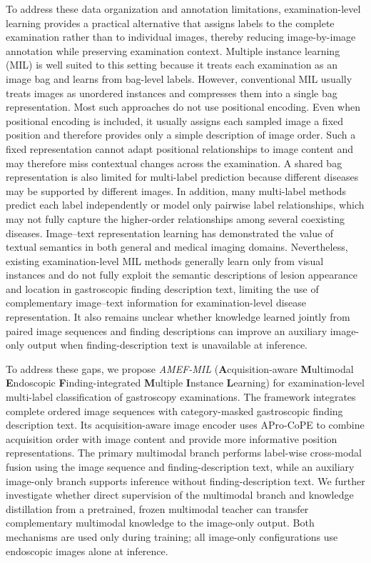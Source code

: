 \documentclass[Afour,sagev,times]{sagej}
\begin{document}
To address these data organization and annotation limitations, examination-level learning provides a practical alternative that assigns labels to the complete examination rather than to individual images, thereby reducing image-by-image annotation while preserving examination context. Multiple instance learning (MIL) is well suited to this setting because it treats each examination as an image bag and learns from bag-level labels. However, conventional MIL usually treats images as unordered instances and compresses them into a single bag representation. Most such approaches do not use positional encoding. Even when positional encoding is included, it usually assigns each sampled image a fixed position and therefore provides only a simple description of image order. Such a fixed representation cannot adapt positional relationships to image content and may therefore miss contextual changes across the examination. A shared bag representation is also limited for multi-label prediction because different diseases may be supported by different images. In addition, many multi-label methods predict each label independently or model only pairwise label relationships, which may not fully capture the higher-order relationships among several coexisting diseases. Image--text representation learning has demonstrated the value of textual semantics in both general and medical imaging domains. Nevertheless, existing examination-level MIL methods generally learn only from visual instances and do not fully exploit the semantic descriptions of lesion appearance and location in gastroscopic finding description text, limiting the use of complementary image--text information for examination-level disease representation. It also remains unclear whether knowledge learned jointly from paired image sequences and finding descriptions can improve an auxiliary image-only output when finding-description text is unavailable at inference.

To address these gaps, we propose \textit{AMEF-MIL} (\textbf{A}cquisition-aware \textbf{M}ultimodal \textbf{E}ndoscopic \textbf{F}inding-integrated \textbf{M}ultiple \textbf{I}nstance \textbf{L}earning) for examination-level multi-label classification of gastroscopy examinations. The framework integrates complete ordered image sequences with category-masked gastroscopic finding description text. Its acquisition-aware image encoder uses APro-CoPE to combine acquisition order with image content and provide more informative position representations. The primary multimodal branch performs label-wise cross-modal fusion using the image sequence and finding-description text, while an auxiliary image-only branch supports inference without finding-description text. We further investigate whether direct supervision of the multimodal branch and knowledge distillation from a pretrained, frozen multimodal teacher can transfer complementary multimodal knowledge to the image-only output. Both mechanisms are used only during training; all image-only configurations use endoscopic images alone at inference.
\end{document}

